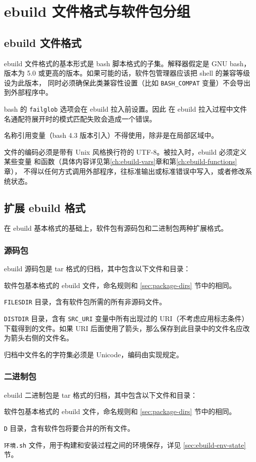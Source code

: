 \chapter{ebuild 文件格式与软件包分组}
\label{ch:ebuild-format-group}
\section{ebuild 文件格式}
\label{sec:ebuild-format}

ebuild 文件格式的基本形式是 bash 脚本格式的子集。解释器假定是 GNU bash，版本为
5.0 或更高的版本。如果可能的话，软件包管理器应该把 shell 的兼容等级设为此版本，
同时必须确保此类兼容性设置（比如 \texttt{BASH_COMPAT} 变量）不会导出到外部程序中。

bash 的 \texttt{failglob} 选项会在 ebuild 拉入前设置。因此
在 ebuild 拉入过程中文件名通配符展开时的模式匹配失败会造成一个错误。

名称引用变量（bash 4.3 版本引入）不得使用，除非是在局部区域中。

文件的编码必须是带有 Unix 风格换行符的 UTF-8。被拉入时，ebuild 必须定义某些变量
和函数（具体内容详见第\ref{ch:ebuild-vars}章和第\ref{ch:ebuild-functions}章），
不得以任何方式调用外部程序，往标准输出或标准错误中写入，或者修改系统状态。

\section{扩展 ebuild 格式}
在 ebuild 基本格式的基础上，软件包有源码包和二进制包两种扩展格式。

\subsection{源码包}
ebuild 源码包是 tar 格式的归档，其中包含以下文件和目录：
\begin{compactitem}
\item 软件包基本格式的 ebuild 文件，命名规则和 \ref{sec:package-dirs} 节中的相同。
\item \texttt{FILESDIR} 目录，含有软件包所需的所有非源码文件。
\item \texttt{DISTDIR} 目录，含有 \texttt{SRC_URI} 变量中所有出现过的 URI（不考虑应用标志条件）
    下载得到的文件。如果 URI 后面使用了箭头，那么保存到此目录中的文件名应改为箭头右侧的文件名。
\end{compactitem}

归档中文件名的字符集必须是 Unicode，编码由实现规定。

\subsection{二进制包}
ebuild 二进制包是 tar 格式的归档，其中包含以下文件和目录：
\begin{compactitem}
\item 软件包基本格式的 ebuild 文件，命名规则和 \ref{sec:package-dirs} 节中的相同。
\item \texttt{D} 目录，含有软件包将要合并的所有文件。
\item \texttt{环境.sh} 文件，用于构建和安装过程之间的环境保存，详见 \ref{sec:ebuild-env-state} 节。
\end{compactitem}

